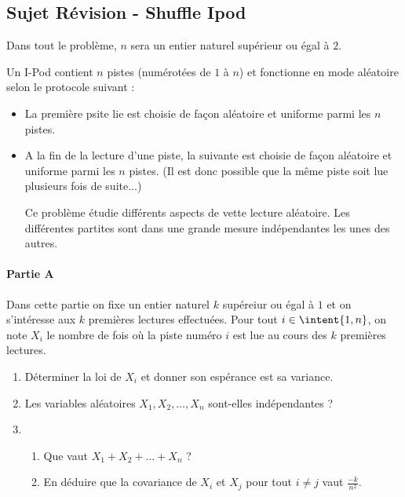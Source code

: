 \subsection{Sujet Révision - Shuffle Ipod}


\begin{probleme}
Dans tout le problème, $n$ sera un entier naturel supérieur ou égal à $2$. 

Un I-Pod contient $n$ pistes (numérotées de $1$ à $n$) et fonctionne en mode aléatoire  selon le protocole suivant : 

\begin{itemize}
\item La première psite lie est choisie de façon aléatoire et uniforme parmi les $n$ pistes. 
\item A la fin de la lecture d'une piste, la suivante est choisie de façon aléatoire et uniforme parmi les $n$ pistes. (Il est donc possible que la même piste soit lue plusieurs fois de suite...) 

Ce problème étudie différents aspects de vette lecture aléatoire. Les différentes partites sont dans une grande mesure indépendantes les unes des autres. 
\end{itemize}


\paragraph{Partie A}
\noindent

Dans cette partie on fixe un entier naturel $k$ supéreiur ou égal à $1$ et on s'intéresse aux $k$ premières lectures effectuées. Pour tout $i\in \intent{1, n}$, on note $X_i$ le nombre de fois où la piste numéro $i$ est lue au cours des $k$ premières lectures. 

\begin{enumerate}
\item Déterminer la loi de $X_i$ et donner son espérance est sa variance. 


\item Les variables aléatoires $X_1, X_2, \dots , X_n $ sont-elles indépendantes ? 


\item \begin{enumerate}
\item Que vaut $X_1 +X_2 +\dots +X_n $ ? 


\item En déduire que la covariance de $X_i$ et $X_j $ pour tout $i\neq j$ vaut $\frac{-k}{n^2}.$



\end{enumerate}
\end{enumerate}
\end{probleme}

